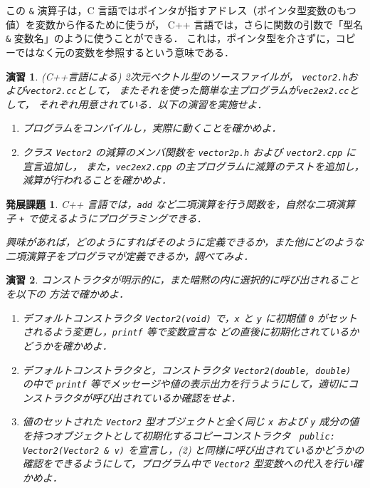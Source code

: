 \documentclass[11pt,a4,epsf]{jarticle}
\newtheorem{exerc}{演習}
\newtheorem{adv}{発展課題}
\begin{document}
この \verb+&+ 演算子は，C 言語ではポインタが指すアドレス（ポインタ型変数のもつ値）を変数から作るために使うが，
C++ 言語では，さらに関数の引数で「型名 \verb+&+ 変数名」のように使うことができる．
これは，ポインタ型を介さずに，コピーではなく元の変数を参照するという意味である．

\begin{exerc} %
(C++言語による) 2次元ベクトル型のソースファイルが，
\verb+vector2.h+および\verb+vector2.cc+として，
またそれを使った簡単な主プログラムが\verb+vec2ex2.cc+として，
それぞれ用意されている．以下の演習を実施せよ．

\begin{enumerate}

\item[(1)] プログラムをコンパイルし，実際に動くことを確かめよ．

\item[(2)] クラス \verb+Vector2+ の減算のメンバ関数を
\verb+vector2p.h+ および \verb+vector2.cpp+ に宣言追加し，
また，\verb+vec2ex2.cpp+ の主プログラムに減算のテストを追加し，
減算が行われることを確かめよ．


\end{enumerate}
\end{exerc} %

\begin{adv}
C++ 言語では，\verb+add+ など二項演算を行う関数を，自然な二項演算子 \verb=+= で使えるようにプログラミングできる．

興味があれば，どのようにすればそのように定義できるか，また他にどのような二項演算子をプログラマが定義できるか，調べてみよ．
\end{adv}

\begin{exerc} %
コンストラクタが明示的に，また暗黙の内に選択的に呼び出されることを以下の
方法で確かめよ．
\begin{enumerate}
\item[(1)] 
デフォルトコンストラクタ \verb+Vector2(void)+ で，\verb+x+ と \verb+y+
に初期値 \verb+0+ がセットされるよう変更し，\verb+printf+ 等で変数宣言な
	   どの直後に初期化されているかどうかを確かめよ．
\item[(2)] 
デフォルトコンストラクタと，コンストラクタ
\verb+Vector2(double, double)+ の中で \verb+printf+ 等でメッセージや値の表示出力を行うようにして，適切にコンストラクタが呼び出されているか確認をせよ．
\item[(3)]
値のセットされた \verb+Vector2+ 型オブジェクトと全く同じ \verb+x+ および
\verb+y+ 成分の値を持つオブジェクトとして初期化するコピーコンストラクタ 
\verb/ public: Vector2(Vector2 & v)/ 
を宣言し，(2) と同様に呼び出されているかどうかの確認をできるようにして，プログラム中で
\verb+Vector2+ 型変数への代入を行い確かめよ．
\end{enumerate}

\end{exerc} %
\end{document}
